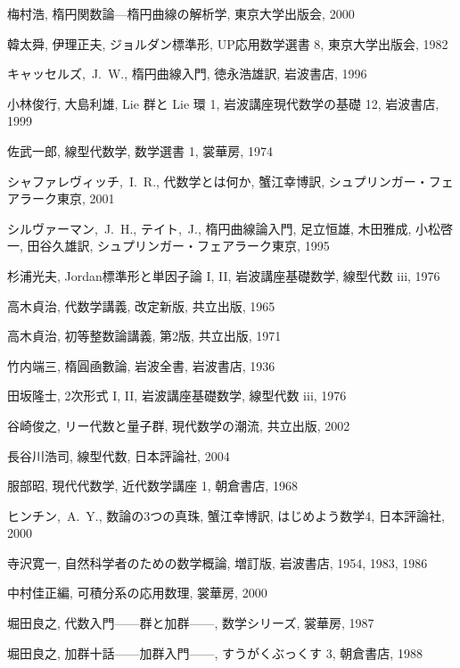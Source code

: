 \documentclass[12pt,twoside]{jarticle}
\begin{document}
\begin{thebibliography}{ABCD}

梅村浩, 楕円関数論---楕円曲線の解析学, 東京大学出版会, 2000

韓太舜, 伊理正夫, ジョルダン標準形, UP応用数学選書 8, 東京大学出版会, 1982

キャッセルズ,~J.~W., 楕円曲線入門, 徳永浩雄訳, 岩波書店, 1996

小林俊行, 大島利雄, Lie 群と Lie 環 1, 岩波講座現代数学の基礎 12,
岩波書店, 1999

佐武一郎, 線型代数学, 数学選書 1, 裳華房, 1974

シャファレヴィッチ,~I.~R., 代数学とは何か, 蟹江幸博訳, シュプリンガー・フェ
アラーク東京, 2001

シルヴァーマン,~J.~H., テイト,~J., 楕円曲線論入門, 
足立恒雄, 木田雅成, 小松啓一, 田谷久雄訳, 
シュプリンガー・フェアラーク東京, 1995

杉浦光夫, Jordan標準形と単因子論 I, II, 岩波講座基礎数学, 線型代数 iii, 1976

高木貞治, 代数学講義, 改定新版, 共立出版, 1965

高木貞治, 初等整数論講義, 第2版, 共立出版, 1971

竹内端三, 楕圓凾數論, 岩波全書, 岩波書店, 1936

田坂隆士, 2次形式 I, II, 岩波講座基礎数学, 線型代数 iii, 1976

谷崎俊之, リー代数と量子群, 現代数学の潮流, 共立出版, 2002

長谷川浩司, 線型代数, 日本評論社, 2004

服部昭, 現代代数学, 近代数学講座 1, 朝倉書店, 1968

ヒンチン,~A.~Y., 数論の3つの真珠, 蟹江幸博訳, はじめよう数学4, 日本評論社, 
2000

寺沢寛一, 自然科学者のための数学概論, 増訂版, 岩波書店, 1954, 1983, 1986

中村佳正編, 可積分系の応用数理, 裳華房, 2000

堀田良之, 代数入門——群と加群——, 数学シリーズ, 裳華房, 1987

堀田良之, 加群十話——加群入門——, すうがくぶっくす 3, 朝倉書店, 1988


\end{thebibliography}
\end{document}
